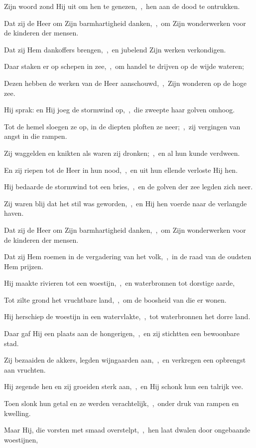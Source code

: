 \documentclass[12pt,twoside,a5paper]{article}
\begin{document}
\begin{halfparskip}
  Zijn woord zond Hij uit om hen te genezen,~\sep\ hen aan de dood te ontrukken.

  Dat zij de Heer om Zijn barmhartigheid danken,~\sep\ om Zijn wonderwerken voor de kinderen der mensen.

  Dat zij Hem dankoffers brengen,~\sep\ en jubelend Zijn werken verkondigen.

  Daar staken er op schepen in zee,~\sep\ om handel te drijven op de wijde wateren;

  Dezen hebben de werken van de Heer aanschouwd,~\sep\ Zijn wonderen op de hoge zee.

  Hij sprak: en Hij joeg de stormwind op,~\sep\ die zweepte haar golven omhoog.

  Tot de hemel sloegen ze op, in de diepten ploften ze neer;~\sep\ zij vergingen van angst in die rampen.

  Zij waggelden en knikten als waren zij dronken;~\sep\ en al hun kunde verdween.

  En zij riepen tot de Heer in hun nood,~\sep\ en uit hun ellende verloste Hij hen.

  Hij bedaarde de stormwind tot een bries,~\sep\ en de golven der zee legden zich neer.

  Zij waren blij dat het stil was geworden,~\sep\ en Hij hen voerde naar de verlangde haven.

  Dat zij de Heer om Zijn barmhartigheid danken,~\sep\ om Zijn wonderwerken voor de kinderen der mensen.

  Dat zij Hem roemen in de vergadering van het volk,~\sep\ in de raad van de oudsten Hem prijzen.

  Hij maakte rivieren tot een woestijn,~\sep\ en waterbronnen tot dorstige aarde,

  Tot zilte grond het vruchtbare land,~\sep\ om de boosheid van die er wonen.

  Hij herschiep de woestijn in een watervlakte,~\sep\ tot waterbronnen het dorre land.

  Daar gaf Hij een plaats aan de hongerigen,~\sep\ en zij stichtten een bewoonbare stad.

  Zij bezaaiden de akkers, legden wijngaarden aan,~\sep\ en verkregen een opbrengst aan vruchten.

  Hij zegende hen en zij groeiden sterk aan,~\sep\ en Hij schonk hun een talrijk vee.

  Toen slonk hun getal en ze werden verachtelijk,~\sep\ onder druk van rampen en kwelling.

  Maar Hij, die vorsten met smaad overstelpt,~\sep\ hen laat dwalen door ongebaande woestijnen,


\end{halfparskip}
\end{document}
